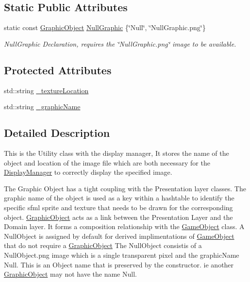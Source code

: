 \subsection*{Static Public Attributes}
\begin{DoxyCompactItemize}
\item 
\mbox{\label{class_graphic_object_a3a6832e8f4af96da2935d3c69757107c}} 
static const \hyperlink{class_graphic_object}{Graphic\+Object} \hyperlink{class_graphic_object_a3a6832e8f4af96da2935d3c69757107c}{Null\+Graphic} \{\char`\"{}Null\char`\"{}, \char`\"{}Null\+Graphic.\+png\char`\"{}\}
\begin{DoxyCompactList}\small\item\em Null\+Graphic Declaration, requires the \char`\"{}\+Null\+Graphic.\+png\char`\"{} image to be available. \end{DoxyCompactList}\end{DoxyCompactItemize}
\subsection*{Protected Attributes}
\begin{DoxyCompactItemize}
\item 
std\+::string \hyperlink{class_graphic_object_a3fc571887a6e46dda4a4ef10d44720b5}{\+\_\+texture\+Location}
\item 
std\+::string \hyperlink{class_graphic_object_a74c9292d37d9be9e099c868be084b33f}{\+\_\+graphic\+Name}
\end{DoxyCompactItemize}


\subsection{Detailed Description}
This is the Utility class with the display manager, It stores the name of the object and location of the image file which are both necessary for the \hyperlink{class_display_manager}{Display\+Manager} to correctly display the specified image. 

The Graphic Object has a tight coupling with the Presentation layer classes. The graphic name of the object is used as a key within a hashtable to identify the specific sfml sprite and texture that needs to be drawn for the corresponding object. \hyperlink{class_graphic_object}{Graphic\+Object} acts as a link between the Presentation Layer and the Domain layer. It forms a composition relationship with the \hyperlink{class_game_object}{Game\+Object} class. A Null\+Object is assigned by default for derived implimentations of \hyperlink{class_game_object}{Game\+Object} that do not require a \hyperlink{class_graphic_object}{Graphic\+Object} The Null\+Object consistis of a Null\+Object.\+png image which is a single transparent pixel and the graphic\+Name Null. This is an Object name that is preserved by the constructor. ie another \hyperlink{class_graphic_object}{Graphic\+Object} may not have the name Null. 

